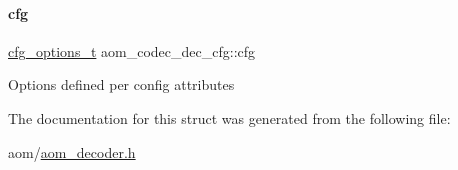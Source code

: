 \paragraph{\texorpdfstring{cfg}{cfg}}
{\footnotesize\ttfamily \hyperlink{group__codec_ga58cddec4492c70945a2b4c3773c665b0}{cfg\+\_\+options\+\_\+t} aom\+\_\+codec\+\_\+dec\+\_\+cfg\+::cfg}

Options defined per config attributes 

The documentation for this struct was generated from the following file\+:\begin{DoxyCompactItemize}
\item 
aom/\hyperlink{aom__decoder_8h}{aom\+\_\+decoder.\+h}\end{DoxyCompactItemize}
